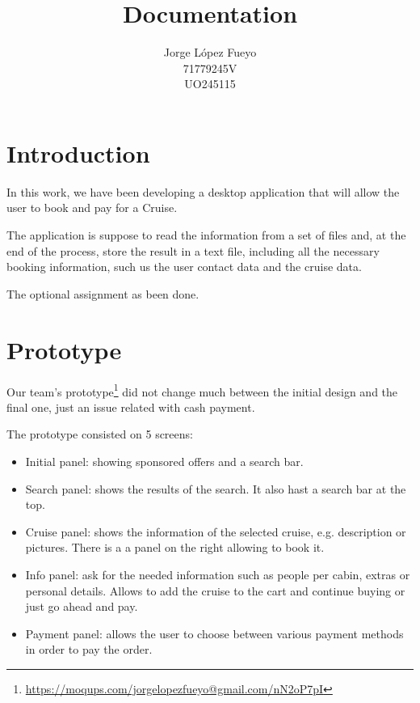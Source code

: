 \documentclass[12pt]{article}
\title{Documentation}
\author{Jorge López Fueyo \\ 71779245V \\ UO245115}
\begin{document}
	
   \maketitle
   \newpage
     
   \section{Introduction}
   
   In this work, we have been developing a desktop application that will allow the user to book and pay for a Cruise.

   The application is suppose to read the information from a set of files and, at the end of the process, store the result in a text file, including all the necessary booking information, such us the user contact data and the cruise data.
   
   The optional assignment as been done.
   
   \section{Prototype}
   Our team's prototype\footnote{\url{https://moqups.com/jorgelopezfueyo@gmail.com/nN2oP7pI}} did not change much between the initial design and the final one, just an issue related with cash payment.
   
   The prototype consisted on 5 screens:
   \begin{itemize}
	   	\item Initial panel: showing sponsored offers and a search bar.
	   	\item Search panel: shows the results of the search. It also hast a search bar at the top.
	   	\item Cruise panel: shows the information of the selected cruise, e.g. description or pictures. There is a a panel on the right allowing to book it.
	   	\item Info panel: ask for the needed information such as people per cabin, extras or personal details. Allows to add the cruise to the cart and continue buying or just go ahead and pay.
	   	\item Payment panel: allows the user to choose between various payment methods in order to pay the order. 
   \end{itemize}
   
\end{document}
